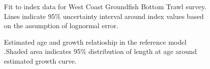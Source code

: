 \documentclass[
]{scrartcl}
\begin{document}
\begin{figure}[H]


\caption{\label{fig-index-wcgbts}Fit to index data for West Coast
Groundfish Bottom Trawl survey. Lines indicate 95\% uncertainty interval
around index values based on the assumption of lognormal error.}

\end{figure}%

\begin{figure}[H]


\caption{\label{fig-vbgf}Estimated age and growth relatioship in the
reference model .Shaded area indicates 95\% distribution of length at
age around estimated growth curve.}

\end{figure}%
\end{document}

